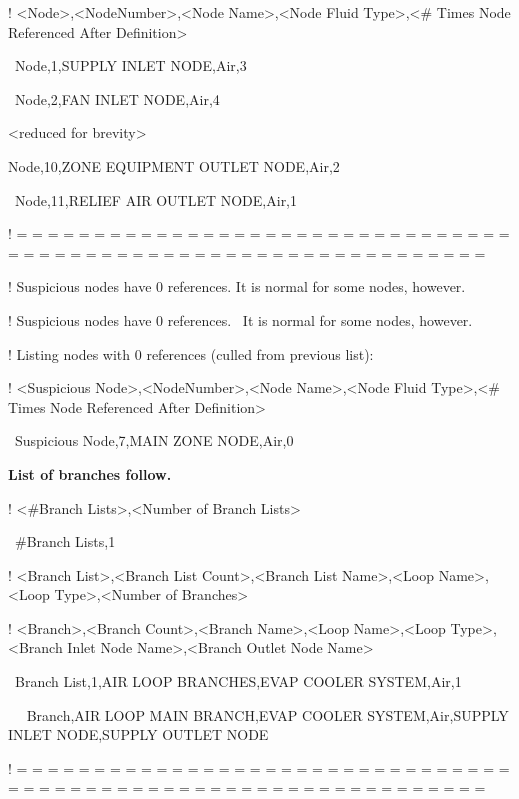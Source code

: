 ! \textless{}Node\textgreater{},\textless{}NodeNumber\textgreater{},\textless{}Node Name\textgreater{},\textless{}Node Fluid Type\textgreater{},\textless{}\# Times Node Referenced After Definition\textgreater{}

~Node,1,SUPPLY INLET NODE,Air,3

~Node,2,FAN INLET NODE,Air,4

\textless{}reduced for brevity\textgreater{}

Node,10,ZONE EQUIPMENT OUTLET NODE,Air,2

~Node,11,RELIEF AIR OUTLET NODE,Air,1

! = = = = = = = = = = = = = = = = = = = = = = = = = = = = = = = = = = = = = = = = = = = = = = = = = = = = = = = = = = = = = = =

! Suspicious nodes have 0 references. It is normal for some nodes, however.

! Suspicious nodes have 0 references.~ It is normal for some nodes, however.

! Listing nodes with 0 references (culled from previous list):

! \textless{}Suspicious Node\textgreater{},\textless{}NodeNumber\textgreater{},\textless{}Node Name\textgreater{},\textless{}Node Fluid Type\textgreater{},\textless{}\# Times Node Referenced After Definition\textgreater{}

~Suspicious Node,7,MAIN ZONE NODE,Air,0

\textbf{List of branches follow.}

! \textless{}\#Branch Lists\textgreater{},\textless{}Number of Branch Lists\textgreater{}

~\#Branch Lists,1

! \textless{}Branch List\textgreater{},\textless{}Branch List Count\textgreater{},\textless{}Branch List Name\textgreater{},\textless{}Loop Name\textgreater{},\textless{}Loop Type\textgreater{},\textless{}Number of Branches\textgreater{}

! \textless{}Branch\textgreater{},\textless{}Branch Count\textgreater{},\textless{}Branch Name\textgreater{},\textless{}Loop Name\textgreater{},\textless{}Loop Type\textgreater{},\textless{}Branch Inlet Node Name\textgreater{},\textless{}Branch Outlet Node Name\textgreater{}

~Branch List,1,AIR LOOP BRANCHES,EVAP COOLER SYSTEM,Air,1

~~ Branch,AIR LOOP MAIN BRANCH,EVAP COOLER SYSTEM,Air,SUPPLY INLET NODE,SUPPLY OUTLET NODE

! = = = = = = = = = = = = = = = = = = = = = = = = = = = = = = = = = = = = = = = = = = = = = = = = = = = = = = = = = = = = = = =

